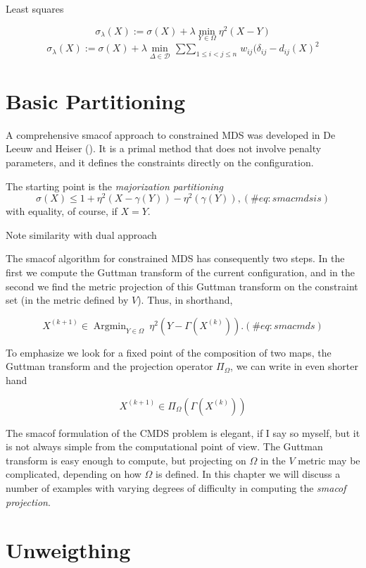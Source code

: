 \documentclass[
  12pt,
  letterpaper,
  DIV=11,
  numbers=noendperiod]{scrreprt}
\theoremstyle{remark}
\begin{document}
Least squares

\[
\sigma_\lambda(X):=\sigma(X)+\lambda\min_{Y\in\Omega}\eta^2(X-Y)
\] \[
\sigma_\lambda(X):=\sigma(X)+\lambda\min_{\Delta\in\mathcal{D}}\mathop{\sum\sum}_{1\leq i<j\leq n}w_{ij}(\delta_{ij}-d_{ij}(X)^2
\]

\section{Basic Partitioning}\label{baspar}

A comprehensive smacof approach to constrained MDS was developed in De
Leeuw and Heiser (). It is a
primal method that does not involve penalty parameters, and it defines
the constraints directly on the configuration.

The starting point is the \emph{majorization partitioning}
\begin{equation}
\sigma(X)\leq 1+\eta^2(X-\gamma(Y))-\eta^2(\gamma(Y)),
(\#eq:smacmdsis)
\end{equation} with equality, of course, if \(X=Y\).

Note similarity with dual approach

The smacof algorithm for constrained MDS has consequently two steps. In
the first we compute the Guttman transform of the current configuration,
and in the second we find the metric projection of this Guttman
transform on the constraint set (in the metric defined by \(V\)). Thus,
in shorthand,

\begin{equation}
X^{(k+1)}\in\mathop{\text{Argmin}}_{Y\in\Omega}\ \eta^2 (Y-\Gamma(X^{(k)})).
(\#eq:smacmds)
\end{equation}

To emphasize we look for a fixed point of the composition of two maps,
the Guttman transform and the projection operator \(\Pi_\Omega\), we can
write in even shorter hand

\[
X^{(k+1)}\in\Pi_\Omega(\Gamma(X^{(k)}))
\]

The smacof formulation of the CMDS problem is elegant, if I say so
myself, but it is not always simple from the computational point of
view. The Guttman transform is easy enough to compute, but projecting on
\(\Omega\) in the \(V\) metric may be complicated, depending on how
\(\Omega\) is defined. In this chapter we will discuss a number of
examples with varying degrees of difficulty in computing the
\emph{smacof projection}.

\section{Unweigthing}\label{majawa}
\end{document}
